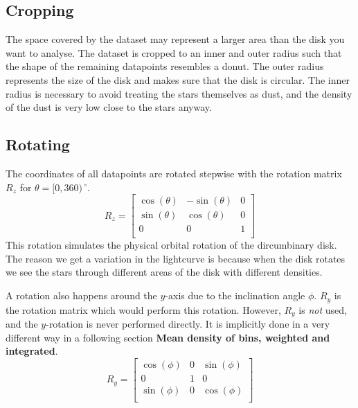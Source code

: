 \documentclass[a4paper, 12pt, english, titlepage]{article}
\newcommand{\degree}{\, ^\circ}    %
\begin{document}
\subsection{Cropping}
    The space covered by the dataset may represent a larger area than the disk you want to analyse. The dataset is cropped to an inner and outer radius such that the shape of the remaining datapoints resembles a donut. The outer radius represents the size of the disk and makes sure that the disk is circular. The inner radius is necessary to avoid treating the stars themselves as dust, and the density of the dust is very low close to the stars anyway.

\subsection{Rotating}
    The coordinates of all datapoints are rotated stepwise with the rotation
    matrix $R_z$ for $\theta = [0, 360)\degree$.
    $$
    R_z = \begin{bmatrix}
        \cos(\theta) & -\sin(\theta) &              0 \\
        \sin(\theta) &  \cos(\theta) &              0 \\
                   0 &             0 &              1 \\
    \end{bmatrix}
    $$
    This rotation simulates the physical orbital rotation of the dircumbinary
    disk. The reason we get a variation in the lightcurve is because when the
    disk rotates we see the stars through different areas of the disk with
    different densities.

    A rotation also happens around the $y$-axis due to the inclination angle $\phi$. $R_y$ is the rotation matrix which would perform this rotation. However, $R_y$ is \emph{not} used, and the $y$-rotation is never performed directly. It is implicitly done in a very different way in a following section \textbf{Mean density of bins, weighted and integrated}.
    $$
    R_y = \begin{bmatrix}
        \cos(\phi) &          0 & \sin(\phi) \\
                 0 &          1 &          0 \\
        \sin(\phi) &          0 & \cos(\phi) \\
    \end{bmatrix}
    $$
\end{document}
